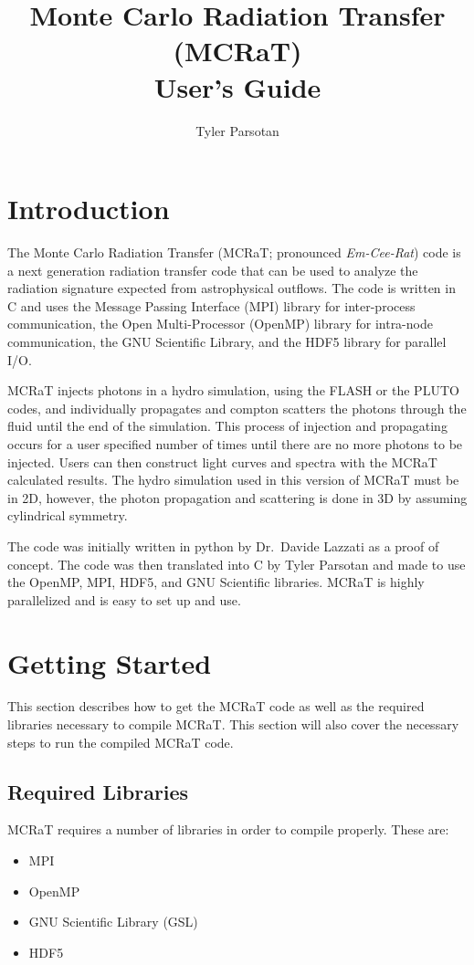 \documentclass[12pt,a4paper]{article}
\title{Monte Carlo Radiation Transfer (MCRaT)\\User's Guide}
\author{Tyler Parsotan}
\date{}
\begin{document}
\maketitle

\tableofcontents
\newpage

\section{Introduction}
The Monte Carlo Radiation Transfer (MCRaT; pronounced \textit{Em-Cee-Rat}) code is a next generation radiation transfer code that can be used to analyze the radiation signature expected from astrophysical outflows. The code is written in C and uses the Message Passing Interface (MPI) library for inter-process communication, the Open Multi-Processor (OpenMP) library for intra-node communication, the GNU Scientific Library, and the HDF5 library for parallel I/O.

MCRaT injects photons in a hydro simulation, using the FLASH or the PLUTO codes, and individually propagates and compton scatters the photons through the fluid until the end of the simulation. This process of injection and propagating occurs for a user specified number of times until there are no more photons to be injected. Users can then construct light curves and spectra with the MCRaT calculated results. The hydro simulation used in this version of MCRaT must be in 2D, however, the photon propagation and scattering is done in 3D by assuming cylindrical symmetry.

The code was initially written in python by Dr.\ Davide Lazzati as a proof of concept. The code was then translated into C by Tyler Parsotan and made to use the OpenMP, MPI, HDF5, and GNU Scientific libraries. MCRaT is highly parallelized and is easy to set up and use.


\section{Getting Started}
This section describes how to get the MCRaT code as well as the required libraries necessary to compile MCRaT. This section will also cover the necessary steps to run the compiled MCRaT code. 

\subsection{Required Libraries}
MCRaT requires a number of libraries in order to compile properly. These are:
\begin{itemize}
\item MPI
\item OpenMP
\item GNU Scientific Library (GSL)
\item HDF5
\end{itemize}
\end{document}
